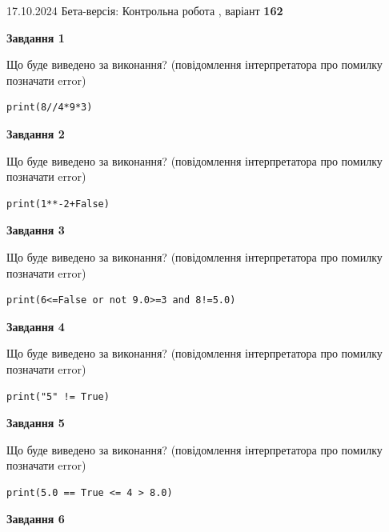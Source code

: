 \documentclass[12pt, ukrainian]{article}
\begin{document}
{\Large{17.10.2024 Бета-версія: Контрольна робота , варіант  \No \textbf { 162 }\par}}
{
\begin {large}
{\begin {center}\textbf{Завдання 1}\end {center}}

Що буде виведено за виконання? (повідомлення інтерпретатора про помилку позначати error)\par
\begin{verbatim}
print(8//4*9*3)
\end{verbatim}

{\begin {center}\textbf{Завдання 2}\end {center}}

Що буде виведено за виконання? (повідомлення інтерпретатора про помилку позначати error)\par
\begin{verbatim}
print(1**-2+False)
\end{verbatim}

{\begin {center}\textbf{Завдання 3}\end {center}}

Що буде виведено за виконання? (повідомлення інтерпретатора про помилку позначати error)\par
\begin{verbatim}
print(6<=False or not 9.0>=3 and 8!=5.0)
\end{verbatim}

{\begin {center}\textbf{Завдання 4}\end {center}}

Що буде виведено за виконання? (повідомлення інтерпретатора про помилку позначати error)\par
\begin{verbatim}
print("5" != True)
\end{verbatim}

{\begin {center}\textbf{Завдання 5}\end {center}}

Що буде виведено за виконання? (повідомлення інтерпретатора про помилку позначати error)\par
\begin{verbatim}
print(5.0 == True <= 4 > 8.0)
\end{verbatim}

{\begin {center}\textbf{Завдання 6}\end {center}}


\end{large}}
\end{document}
